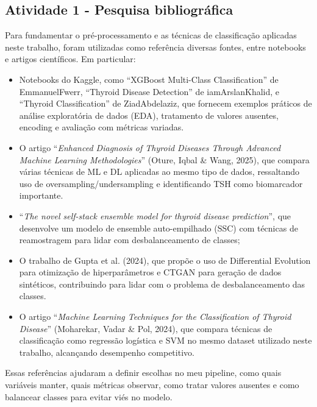 \documentclass[11pt]{article}
\begin{document}
\subsection{Atividade 1 - Pesquisa bibliográfica}
Para fundamentar o pré-processamento e as técnicas de classificação aplicadas neste trabalho, foram utilizadas como referência diversas fontes, entre notebooks e artigos científicos. Em particular:

\begin{itemize}
  \item Notebooks do Kaggle, como “XGBoost Multi-Class Classification” de EmmanuelFwerr, “Thyroid Disease Detection” de iamArslanKhalid, e “Thyroid Classification” de ZiadAbdelaziz, que fornecem exemplos práticos de análise exploratória de dados (EDA), tratamento de valores ausentes, encoding e avaliação com métricas variadas.
  \item O artigo “\textit{Enhanced Diagnosis of Thyroid Diseases Through Advanced Machine Learning Methodologies}” (Oture, Iqbal \& Wang, 2025), que compara várias técnicas de ML e DL aplicadas ao mesmo tipo de dados, ressaltando uso de oversampling/undersampling e identificando TSH como biomarcador importante.\cite{oture2025enhanced}
  \item “\textit{The novel self-stack ensemble model for thyroid disease prediction}”\cite{Ji2024_SSC_Thyroid}, que desenvolve um modelo de ensemble auto-empilhado (SSC) com técnicas de reamostragem para lidar com desbalanceamento de classes;
  \item O trabalho de Gupta et al. (2024)\cite{Gupta2024}, que propõe o uso de Differential Evolution para otimização de hiperparâmetros e CTGAN para geração de dados sintéticos, contribuindo para lidar com o problema de desbalanceamento das classes.
  \item O artigo “\textit{Machine Learning Techniques for the Classification of Thyroid Disease}” (Moharekar, Vadar \& Pol, 2024), que compara técnicas de classificação como regressão logística e SVM no mesmo dataset utilizado neste trabalho, alcançando desempenho competitivo.\cite{Moharekar2024} 
\end{itemize}
Essas referências ajudaram a definir escolhas no meu pipeline, como quais variáveis manter, quais métricas observar, como tratar valores ausentes e como balancear classes para evitar viés no modelo.
\end{document}
